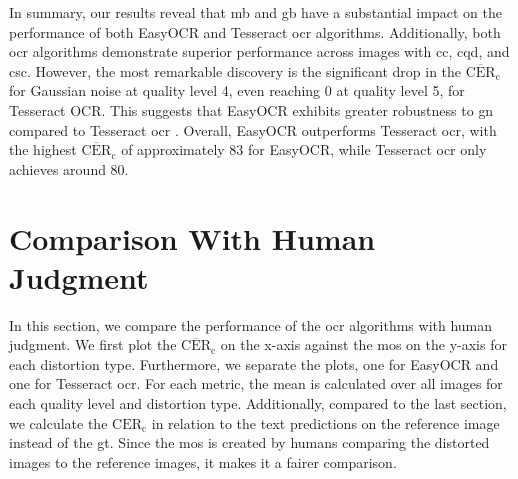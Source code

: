 In summary, our results reveal that \gls{mb} and \gls{gb} have a substantial impact on the performance of both EasyOCR and Tesseract \gls{ocr} algorithms.
Additionally, both \gls{ocr} algorithms demonstrate superior performance across images with \gls{cc}, \gls{cqd}, and \gls{csc}.
However, the most remarkable discovery is the significant drop in the $\overline{\text{CER}}_{\text{c}}$ for Gaussian noise at quality level 4, even reaching 0 at quality level 5, for Tesseract OCR.
This suggests that EasyOCR exhibits greater robustness to \gls{gn} compared to Tesseract \gls{ocr} .
Overall, EasyOCR outperforms Tesseract \gls{ocr}, with the highest $\overline{\text{CER}}_{\text{c}}$ of approximately 83 for EasyOCR, while Tesseract \gls{ocr} only achieves around 80.




\section{Comparison With Human Judgment}
\label{sec:comparison_with_human_judgment}

In this section, we compare the performance of the \gls{ocr} algorithms with human judgment.
We first plot the $\overline{\text{CER}}_{\text{c}}$ on the x-axis against the \gls{mos} on the y-axis for each distortion type.
Furthermore, we separate the plots, one for EasyOCR and one for Tesseract \gls{ocr}.
For each metric, the mean is calculated over all images for each quality level and distortion type.
Additionally, compared to the last section, we calculate the $\text{CER}_{\text{c}}$ in relation to the text predictions on the reference image instead of the \gls{gt}.
Since the \gls{mos} is created by humans comparing the distorted images to the reference images, it makes it a fairer comparison.

